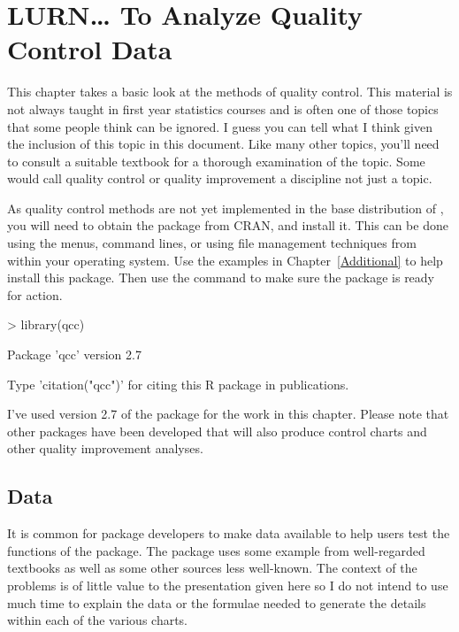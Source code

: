 
\chapter{LURN\ldots{} To Analyze Quality Control Data} 
\label{QualityControl} 
 

This chapter takes a basic look at the methods of quality control. This material is not always taught in first year statistics courses and is often one of those topics that some people think can be ignored. I guess you can tell what I think given the inclusion of this topic in this document. Like many other topics, you'll need to consult a suitable textbook for a thorough examination of the topic. Some would call quality control or quality improvement a discipline not just a topic. 
 
As quality control methods are not yet implemented in the base distribution of \R{}, you will need to obtain the  package from CRAN, and install it. This can be done using the menus, command lines, or using file management techniques from within your operating system. Use the examples in Chapter~\ref{Additional} to help install this package. Then use the  command to make sure the package is ready for action. 
\begin{Schunk}
\begin{Sinput}
> library(qcc) 
\end{Sinput}
\begin{Soutput}
Package 'qcc' version 2.7
\end{Soutput}
\begin{Soutput}
Type 'citation("qcc")' for citing this R package in publications.
\end{Soutput}
\end{Schunk}
I've used version 2.7 of the  package for the work in this chapter. Please note that other packages have been developed that will also produce control charts and other quality improvement analyses. 
 
 
\section{Data} 
 
It is common for package developers to make data available to help users test the functions of the package. The  package uses some example from well-regarded textbooks as well as some other sources less well-known. The context of the problems is of little value to the presentation given here so I do not intend to use much time to explain the data or the formulae needed to generate the details within each of the various charts. 

